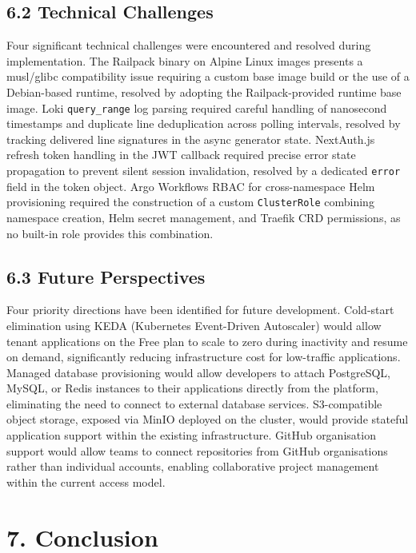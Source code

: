 \subsection*{6.2 Technical Challenges}

Four significant technical challenges were encountered and resolved during implementation. The Railpack binary on Alpine Linux images presents a musl/glibc compatibility issue requiring a custom base image build or the use of a Debian-based runtime, resolved by adopting the Railpack-provided runtime base image. Loki \texttt{query\_range} log parsing required careful handling of nanosecond timestamps and duplicate line deduplication across polling intervals, resolved by tracking delivered line signatures in the async generator state. NextAuth.js refresh token handling in the JWT callback required precise error state propagation to prevent silent session invalidation, resolved by a dedicated \texttt{error} field in the token object. Argo Workflows RBAC for cross-namespace Helm provisioning required the construction of a custom \texttt{ClusterRole} combining namespace creation, Helm secret management, and Traefik CRD permissions, as no built-in role provides this combination.

\subsection*{6.3 Future Perspectives}

Four priority directions have been identified for future development. Cold-start elimination using KEDA (Kubernetes Event-Driven Autoscaler) would allow tenant applications on the Free plan to scale to zero during inactivity and resume on demand, significantly reducing infrastructure cost for low-traffic applications. Managed database provisioning would allow developers to attach PostgreSQL, MySQL, or Redis instances to their applications directly from the platform, eliminating the need to connect to external database services. S3-compatible object storage, exposed via MinIO deployed on the cluster, would provide stateful application support within the existing infrastructure. GitHub organisation support would allow teams to connect repositories from GitHub organisations rather than individual accounts, enabling collaborative project management within the current access model.

\section*{7. Conclusion}

